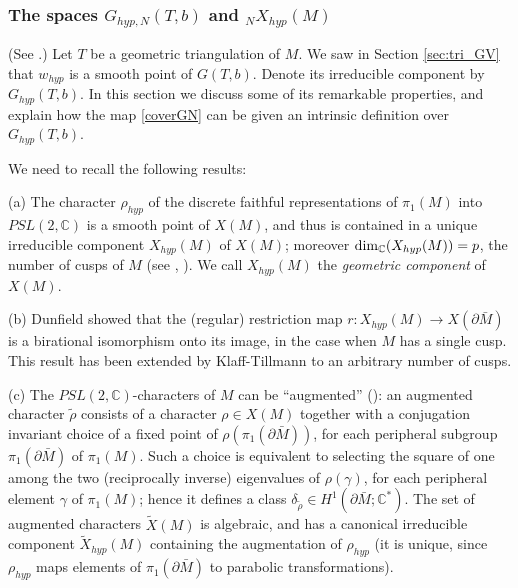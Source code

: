 \documentclass[11pt]{amsart}
\newcommand{\mc}{\mathbb{C}}
\newcommand{\ra}{\rightarrow}
\begin{document}
\subsubsection{The spaces $G_{hyp,N}(T,b)$ and ${}_NX_{hyp}(M)$}\label{GhypN}{\rm (See \cite[Section 4]{AGT}.) Let $T$ be a geometric triangulation of $M$. We saw in Section \ref{sec:tri_GV} that $w_{hyp}$ is a smooth point of $G(T,b)$. Denote its irreducible component by $G_{hyp}(T,b)$. In this section we discuss some of its remarkable properties, and explain how the map \eqref{coverGN} can be given an intrinsic definition over $G_{hyp}(T,b)$.
\smallskip

We need to recall the following results:
\smallskip

(a) The character $\rho_{hyp}$ of the discrete faithful representations of $\pi_1(M)$ into $PSL(2,\mc)$ is a smooth point of $X(M)$, and thus is contained in a unique irreducible component $X_{hyp}(M)$ of $X(M)$; moreover ${\rm dim}_\mc(X_{hyp}(M)) = p$, the number of cusps of $M$ (see \cite[Chapter 4.5]{Shalen}, \cite[Theorem 8.44]{Kapo}). We call $X_{hyp}(M)$ the {\it geometric component} of $X(M)$.
\smallskip

(b) Dunfield \cite{Dun} showed that the (regular) restriction map $r\colon X_{hyp}(M) \ra X(\partial \bar M)$ is a birational isomorphism onto its image, in the case when $M$ has a single cusp.  This result has been extended by Klaff-Tillmann \cite{KT} to an arbitrary number of cusps. 
\smallskip

(c) The $PSL(2,\mc)$-characters of $M$ can be ``augmented'' (\cite{Champ,BD}): an augmented character $\tilde{\rho}$ consists of a character $\rho\in X(M)$ together with a conjugation invariant choice of a fixed point of $\rho(\pi_1(\partial \bar{M}))$, for each peripheral subgroup $\pi_1(\partial \bar{M})$ of $\pi_1(M)$. Such a choice is equivalent to selecting the square of one among the two (reciprocally inverse) eigenvalues of $\rho(\gamma)$, for each peripheral element $\gamma$ of $\pi_1(M)$; hence it defines a class $\delta_{\tilde \rho}\in H^1(\partial \bar M;\mc^*)$. The set of augmented characters $\tilde{X}(M)$ is algebraic, and has a canonical irreducible component $\tilde{X}_{hyp}(M)$ containing the augmentation of $\rho_{hyp}$ (it is unique, since $\rho_{hyp}$ maps elements of $\pi_1(\partial \bar M)$ to parabolic transformations). 
\smallskip

}
\end{document}
